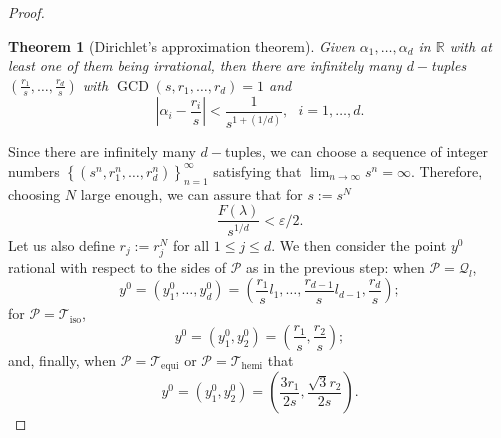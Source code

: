 \documentclass{amsart}
\newtheorem{theorem}{Theorem}[section]
\theoremstyle{definition}
\theoremstyle{remark}
\newcommand{\ep}{\varepsilon}
\renewcommand\leq\leqslant
\numberwithin{equation}{section}
\theoremstyle{definition}
\theoremstyle{remark}
\DeclareMathOperator\GCD{GCD}
\begin{document}
\begin{proof}
\begin{theorem}[Dirichlet's approximation theorem]
		Given $\alpha_1,\ldots,\alpha_d$ in $\mathbb{R}$ with at least one of them being irrational, then there are infinitely many $d-$tuples $\left(\frac{r_1}{s},\ldots,\frac{r_d}{s}\right)$ with $\GCD(s,r_1,\ldots,r_d)=1$ and \begin{equation}
			\left|\alpha_i-\frac{r_i}{s}\right|<\frac{1}{s^{1+(1/d)}},\ \ \ i=1,\ldots,d.
		\end{equation}
	\end{theorem}
	Since there are infinitely many $d-$tuples, we can choose a sequence of integer numbers $\left\{(s^n,r_1^n,\ldots,r_d^n)\right\} _{n=1}^\infty$ satisfying that $\lim_{n\rightarrow\infty}s^n=\infty$. Therefore, choosing $N$ large enough, we can assure that for $s:=s^N$ \begin{equation}
		\frac{F(\lambda)}{s^{1/d}}<\ep/2.
	\end{equation}
	Let us also define $r_j:=r_j^N$ for all $1\leq j\leq d$. We then consider the point $y^0$ rational with respect to the sides of $\mathcal{P}$ as in the previous step: when $\mathcal{P}=\mathcal{Q}_l$, 
	\begin{equation}
		y^0=(y^0_1,\ldots,y_d^0)=\left(\frac{r_1}{s}l_1,\ldots,\frac{r_{d-1}}{s}l_{d-1},\frac{r_d}{s}\right);
	\end{equation}for $\mathcal{P}=\mathcal{T}_\mathrm{iso}$,\begin{equation}
		y^0=(y^0_1,y_2^0)=\left(\frac{r_1}{s},\frac{r_2}{s}\right);
	\end{equation} and, finally, when $\mathcal{P}=	\mathcal{T}_\mathrm{equi}$ or $\mathcal{P}=\mathcal{T}_\mathrm{hemi}$ that 
	\begin{equation}
		y^0=(y^0_1,y_2^0)=\left(\frac{3r_1}{2s},\frac{\sqrt{3}r_2}{2s}\right).
	\end{equation}
	

\end{proof}
\end{document}
